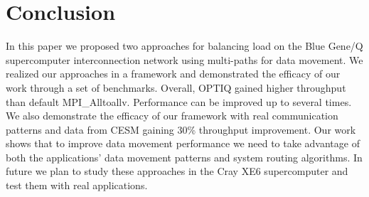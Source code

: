 \section{Conclusion}
\label{sec:conclusion}

In this paper we proposed two approaches for balancing load on the Blue Gene/Q supercomputer interconnection network using multi-paths for data movement. We realized our approaches in a framework and demonstrated the efficacy of our work through a set of benchmarks. Overall, OPTIQ gained higher throughput than default MPI\_Alltoallv. Performance can be improved up to several times. We also demonstrate the efficacy of our framework with real communication patterns and data from CESM gaining 30\% throughput improvement. Our work shows that to improve data movement performance we need to take advantage of both the applications' data movement patterns and system routing algorithms. In future we plan to study these approaches in the Cray XE6 supercomputer and test them with real applications.
